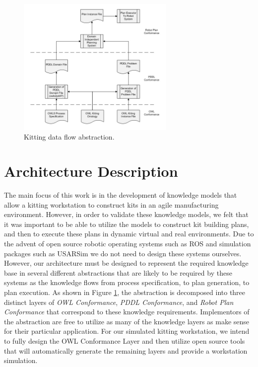 \documentclass[a4paper, 10pt, conference]{ieeeconf}      %
\begin{document}
\begin{figure}[htb]
\includegraphics[width=7.6cm]{images/ProcessDataFlowV2.jpg}
\caption{Kitting data flow abstraction.}
\label{fig:ProcessDataFlow}
\end{figure}

\section{Architecture Description}
\label{sect:Architecture}
The main focus of this work is in the development of knowledge models that allow a kitting workstation to construct kits
in an agile manufacturing environment. However, in order to validate these knowledge models, we felt that it was
important to be able to utilize the models to construct kit building plans, and then to execute these plans in dynamic
virtual and real environments. Due to the advent of open source robotic operating systems such as ROS \cite{ROS} and simulation
packages such as USARSim \cite{Balakirsky2007} we do not need to design these systems ourselves. However, our architecture must
be designed to represent the required knowledge base in several different abstractions that are likely to be
required by these systems as the knowledge flows from process specification, to plan generation, to plan execution. 
As shown in Figure \ref{fig:ProcessDataFlow}, the abstraction is decomposed into three
distinct layers of {\it OWL Conformance}, {\it PDDL Conformance}, and {\it Robot Plan Conformance} that correspond to these
knowledge requirements. Implementors of the abstraction are free to utilize as many of the knowledge layers as make sense for
their particular application. For our simulated kitting workstation, we intend to fully design the OWL Conformance Layer and
then utilize open
source tools that will automatically generate the remaining layers and provide a workstation simulation.
\end{document}
